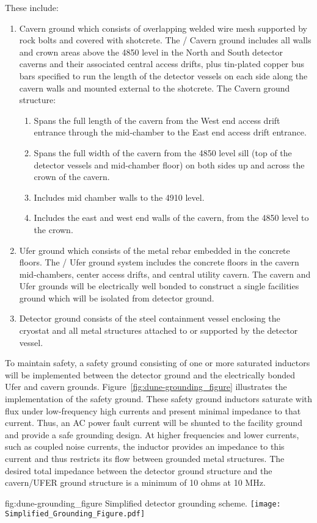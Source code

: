These include:
\begin{enumerate}
 \item Cavern ground which consists of overlapping welded wire mesh
   supported by rock bolts and covered with shotcrete. The
   / Cavern ground includes all walls and
   crown areas above the 4850 level in the North and South detector
   caverns and their associated central access drifts, plus tin-plated
   copper bus bars specified to run the length of the detector vessels
   on each side along the cavern walls and mounted external to the
   shotcrete.  The Cavern ground structure:
\begin{enumerate}
 \item Spans the full length of the cavern from the West end access
   drift entrance through the mid-chamber to the East end access drift
   entrance.
 \item Spans the full width of the cavern from the 4850 level sill
   (top of the detector vessels and mid-chamber floor) on both sides
   up and across the crown of the cavern.
 \item Includes mid chamber walls to the 4910 level.
 \item Includes the east and west end walls of the cavern, from the
   4850 level to the crown.
\end{enumerate}
 \item Ufer ground which consists of the metal rebar embedded in the
   concrete floors. The / Ufer ground system
   includes the concrete floors in the cavern mid-chambers, center
   access drifts, and central utility cavern. The cavern and Ufer
   grounds will be electrically well bonded to construct a single
   facilities ground which will be isolated from detector ground.
 \item Detector ground consists of the steel containment vessel
   enclosing the cryostat and all metal structures attached to or
   supported by the detector vessel.
\end{enumerate}


To maintain safety, a safety ground consisting of one or more
saturated inductors will be implemented between the detector ground
and the electrically bonded Ufer and cavern grounds.
Figure~\ref{fig:dune-grounding_figure} illustrates the implementation
of the safety ground. These safety ground inductors saturate with flux
under low-frequency high currents and present minimal impedance to
that current.  Thus, an AC power fault current will be shunted to the
facility ground and provide a safe grounding design. At higher
frequencies and lower currents, such as coupled noise currents, the
inductor provides an impedance to this current and thus restricts its
flow between grounded metal structures. The desired total impedance
between the detector ground structure and the cavern/UFER ground
structure is a minimum of 10 ohms at 10 MHz.
\begin{dunefigure}{fig:dune-grounding_figure}
  {Simplified detector grounding scheme.}
  \texttt{[image: Simplified\_Grounding\_Figure.pdf]}
\end{dunefigure}


